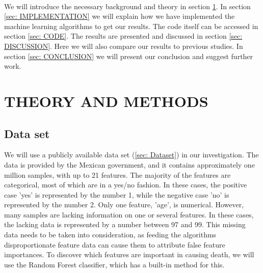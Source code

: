 \documentclass[english,notitlepage,reprint,nofootinbib]{revtex4-1}  %
\begin{document}
\\
We will introduce the necessary background and theory in section \ref{sec: METHODS}. In section \ref{sec: IMPLEMENTATION} we will explain how we have implemented the machine learning algorithms to get our results. The code itself can be accessed in section \ref{sec: CODE}. The results are presented and discussed in section \ref{sec: DISCUSSION}. Here we will also compare our results to previous studies. In section \ref{sec: CONCLUSION} we will present our conclusion and suggest further work. 

\section{THEORY AND METHODS}
\label{sec: METHODS}


\subsection{Data set}\label{subsec: DATA}
We will use a publicly available data set (\ref{sec: Dataset}) in our investigation. The data is provided by the Mexican government, and it contains approximately one million samples, with up to 21 features. The majority of the features are categorical, most of which are in a yes/no fashion. In these cases, the positive case 'yes' is represented by the number 1, while the negative case 'no' is represented by the number 2. Only one feature, 'age', is numerical. 
However, many samples are lacking information on one or several features. In these cases, the lacking data is represented by a number between 97 and 99. This missing data needs to be taken into consideration, as feeding the algorithms disproportionate feature data can cause them to attribute false feature importances.
To discover which features are important in causing death, we will use the Random Forest classifier, which has a built-in method for this.
\end{document}
